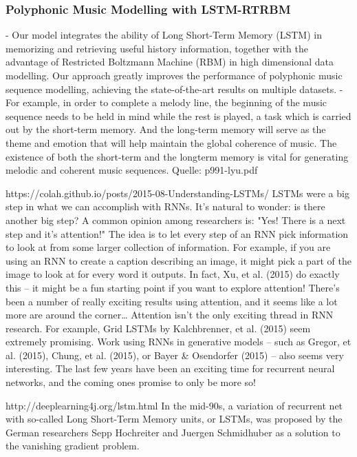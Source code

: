 {\subsubsection{Polyphonic Music Modelling with LSTM-RTRBM}
- Our model integrates the ability of Long Short-Term Memory (LSTM) in memorizing and retrieving useful history information, together with the advantage of Restricted Boltzmann Machine (RBM) in high dimensional data modelling. Our approach greatly improves the performance of polyphonic music sequence modelling, achieving the state-of-the-art results on multiple datasets.
- For example, in order to complete a melody line, the beginning of the music sequence needs to be held in mind while the rest is played, a task which is carried out by the short-term memory. And the long-term memory will serve as the theme and emotion that will help maintain the global coherence of music. The existence of both the short-term and the longterm memory is vital for generating melodic and coherent music sequences.
Quelle: p991-lyu.pdf





https://colah.github.io/posts/2015-08-Understanding-LSTMs/
LSTMs were a big step in what we can accomplish with RNNs. It’s natural to wonder: is there another big step? A common opinion among researchers is: "Yes! There is a next step and it’s attention!" The idea is to let every step of an RNN pick information to look at from some larger collection of information. For example, if you are using an RNN to create a caption describing an image, it might pick a part of the image to look at for every word it outputs. In fact, Xu, et al. (2015) do exactly this – it might be a fun starting point if you want to explore attention! There’s been a number of really exciting results using attention, and it seems like a lot more are around the corner…
Attention isn’t the only exciting thread in RNN research. For example, Grid LSTMs by Kalchbrenner, et al. (2015) seem extremely promising. Work using RNNs in generative models – such as Gregor, et al. (2015), Chung, et al. (2015), or Bayer \& Osendorfer (2015) – also seems very interesting. The last few years have been an exciting time for recurrent neural networks, and the coming ones promise to only be more so!

http://deeplearning4j.org/lstm.html
In the mid-90s, a variation of recurrent net with so-called Long Short-Term Memory units, or LSTMs, was proposed by the German researchers Sepp Hochreiter and Juergen Schmidhuber as a solution to the vanishing gradient problem.
} %